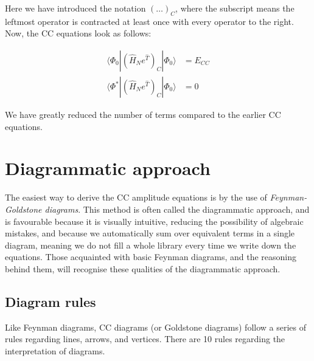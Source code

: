 \documentclass[10pt,twoside]{report}
\begin{document}
	Here we have introduced the notation $(\ldots)_C$, where the subscript means the leftmost operator is contracted at least once with every operator to the right.\\
	
	Now, the CC equations look as follows:
	
	\begin{align}
	\langle\Phi_0|\left(\hat{H}_Ne^{\hat{T}}\right)_C|\Phi_0\rangle &= E_{CC}\\
	\langle\Phi^*|\left(\hat{H}_Ne^{\hat{T}}\right)_C|\Phi_0\rangle &= 0
	\end{align}
	
	We have greatly reduced the number of terms compared to the earlier CC equations.
	
	\section{Diagrammatic approach}
	The easiest way to derive the CC amplitude equations is by the use of \emph{Feynman-Goldstone diagrams}. This method is often called the diagrammatic approach, and is favourable because it is visually intuitive, reducing the possibility of algebraic mistakes, and because we automatically sum over equivalent terms in a single diagram, meaning we do not fill a whole library every time we write down the equations. Those acquainted with basic Feynman diagrams, and the reasoning behind them, will recognise these qualities of the diagrammatic approach.
	
	\subsection{Diagram rules}
	Like Feynman diagrams, CC diagrams (or Goldstone diagrams) follow a series of rules regarding lines, arrows, and vertices. There are 10 rules \cite{ShavittBartlett09} regarding the interpretation of diagrams.
	
\end{document}

